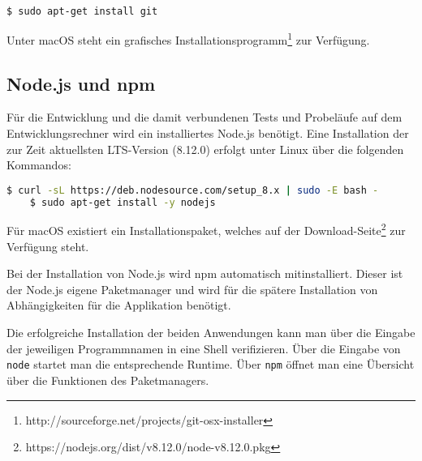 \begin{lstlisting}[language=bash, caption=Installation von Git, label=ls:vorbereitung_git]
    $ sudo apt-get install git
\end{lstlisting}

Unter macOS steht ein grafisches Installationsprogramm\footnote{http://sourceforge.net/projects/git-osx-installer} zur
Verfügung.

\subsection{Node.js und npm}
Für die Entwicklung und die damit verbundenen Tests und Probeläufe auf dem Entwicklungsrechner wird ein installiertes
Node.js benötigt. Eine Installation der zur Zeit aktuellsten LTS-Version (8.12.0) erfolgt unter Linux über die folgenden
Kommandos:

\begin{lstlisting}[language=bash, caption=Installation von Node.js, label=ls:vorbereitung_nodejs]
    $ curl -sL https://deb.nodesource.com/setup_8.x | sudo -E bash -
    $ sudo apt-get install -y nodejs
\end{lstlisting}

Für macOS existiert ein Installationspaket, welches auf der Download-Seite\footnote{https://nodejs.org/dist/v8.12.0/node-v8.12.0.pkg}
zur Verfügung steht.

Bei der Installation von Node.js wird npm automatisch mitinstalliert. Dieser ist der Node.js eigene Paketmanager und
wird für die spätere Installation von Abhängigkeiten für die Applikation benötigt.

Die erfolgreiche Installation der beiden Anwendungen kann man über die Eingabe der jeweiligen Programmnamen in eine Shell
verifizieren. Über die Eingabe von \texttt{node} startet man die entsprechende Runtime. Über \texttt{npm} öffnet man
eine Übersicht über die Funktionen des Paketmanagers.